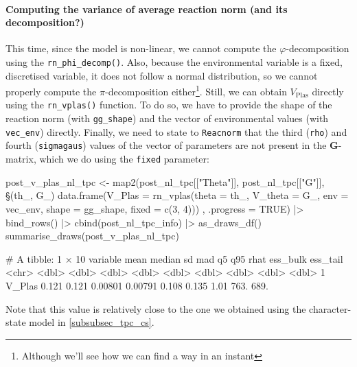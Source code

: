 \documentclass[a4paper,12pt,twoside]{article}
\begin{document}
\paragraph{Computing the variance of average reaction norm (and its decomposition?)}
This time, since the model is non-linear, we cannot compute the $\varphi$-decomposition using the \texttt{rn\_phi\_decomp()}.
Also, because the environmental variable is a fixed, discretised variable, it does not follow a normal distribution, so we cannot properly compute the $\pi$-decomposition either\footnote{Although we'll see how we can find a way in an instant}.
Still, we can obtain $V_{\text{Plas}}$ directly using the \texttt{rn\_vplas()} function. To do so, we have to provide the shape of the reaction norm (with \texttt{gg\_shape}) and the vector of environmental values (with \texttt{vec\_env}) directly.
Finally, we need to state to \texttt{Reacnorm} that the third (\texttt{rho}) and fourth (\texttt{sigmagaus}) values of the vector of parameters are not present in the $\mathbf{G}$-matrix, which we do using the \texttt{fixed} parameter:
\begin{Rinput}
post_v_plas_nl_tpc <-
    map2(post_nl_tpc[["Theta"]], post_nl_tpc[["G"]],
         \§§(th_, G_) { data.frame(V_Plas = rn_vplas(theta    = th_,
                                                   V_theta  = G_,
                                                   env      = vec_env,
                                                   shape    = gg_shape,
                                                   fixed    = c(3, 4))) },
         .progress = TRUE) |>
    bind_rows() |>
    cbind(post_nl_tpc_info) |>
    as_draws_df()
summarise_draws(post_v_plas_nl_tpc)
\end{Rinput}
\begin{Routput}
# A tibble: 1 × 10
  variable  mean median      sd     mad    q5   q95  rhat ess_bulk ess_tail
  <chr>    <dbl>  <dbl>   <dbl>   <dbl> <dbl> <dbl> <dbl>    <dbl>    <dbl>
1 V_Plas   0.121  0.121 0.00801 0.00791 0.108 0.135  1.01     763.     689.
\end{Routput}
Note that this value is relatively close to the one we obtained using the character-state model in \autoref{subsubsec_tpc_cs}.
\end{document}
